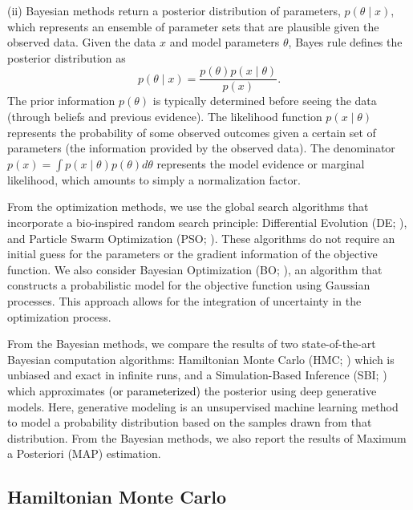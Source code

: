 \documentclass[12pt]{article}
\begin{document}
(ii) Bayesian methods return a posterior distribution of parameters, $ p(\theta \mid x)$, which represents an ensemble of parameter sets that are plausible given the observed data. Given the data $x$ and model parameters $\theta$, Bayes rule defines the posterior distribution as
\begin{equation}
    p(\theta \mid x) = \frac{p(\theta) p(x \mid \theta)}{p(x)}. \label{eq:Bayes_rule}
\end{equation}
The prior information $p(\theta)$ is typically determined before seeing the data (through beliefs and previous evidence). The likelihood function $p(x \mid \theta)$ represents the probability of some observed outcomes given a certain set of parameters (the information provided by the observed data). The denominator $p(x)=\int p(x \mid \theta)p(\theta)d\theta$ represents the model evidence or marginal likelihood, which amounts to simply a normalization factor.


From the optimization methods, we use the global search algorithms that incorporate a bio-inspired random search principle: Differential Evolution (DE; \cite{Storn1997, Price1999}), and Particle Swarm Optimization (PSO; \cite{Kennedy1995, Eberhart1995}). These algorithms do not require an initial guess for the parameters or the gradient information of the objective function. We also consider Bayesian Optimization (BO; \cite{Snoek2012, Shahriari2015}), an algorithm that constructs a probabilistic model for the objective function using Gaussian processes. This approach allows for the integration of uncertainty in the optimization process.


From the Bayesian methods, we compare the results of two state-of-the-art Bayesian computation algorithms: Hamiltonian Monte Carlo (HMC; \cite{Duane1987, Neal2010}) which is unbiased and exact in infinite runs, and a Simulation-Based Inference (SBI; \cite{Cranmer2020, Brehmer2021}) which approximates \textcolor{black}{(or parameterized)} the posterior using deep generative models. Here, generative modeling is an unsupervised machine learning method to model a probability distribution based on the samples drawn from that distribution.  From the Bayesian methods, we also report the results of Maximum a Posteriori (MAP) estimation. 



\subsection{Hamiltonian Monte Carlo}
\end{document}
